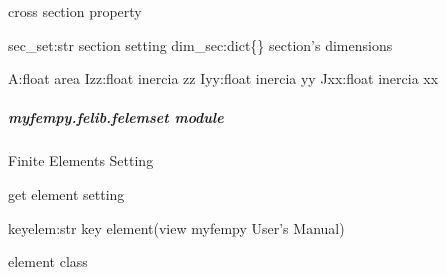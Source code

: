 \documentclass[letterpaper,10pt,english]{sphinxmanual}
\begin{document}

\begin{fulllineitems}
\label{\detokenize{myfempy.felib:myfempy.felib.crossec.sect_prop}}
\pysigstartsignatures
{}
\pysigstopsignatures
\sphinxAtStartPar
cross section property
\begin{description}
\sphinxAtStartPar
sec\_set:str \textendash{} section setting
dim\_sec:dict\{\} \textendash{} section’s dimensions

\sphinxAtStartPar
A:float   \textendash{} area
Izz:float \textendash{} inercia zz
Iyy:float \textendash{} inercia yy
Jxx:float \textendash{} inercia xx

\end{description}

\end{fulllineitems}



\subparagraph{myfempy.felib.felemset module}
\label{\detokenize{myfempy.felib:module-myfempy.felib.felemset}}\label{\detokenize{myfempy.felib:myfempy-felib-felemset-module}}
\sphinxAtStartPar
Finite Elements Setting

\begin{fulllineitems}
\label{\detokenize{myfempy.felib:myfempy.felib.felemset.get_elemset}}
\pysigstartsignatures
{}
\pysigstopsignatures
\sphinxAtStartPar
get element setting
\begin{description}
\sphinxAtStartPar
keyelem:str \textendash{} key element(view myfempy User’s Manual)

\sphinxAtStartPar
element class

\end{description}

\end{fulllineitems}
\end{document}
